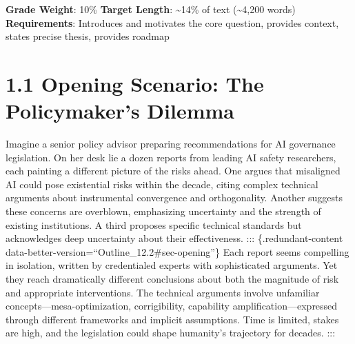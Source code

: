 \documentclass[
  11pt,
  letterpaper,
]{book}
\begin{document}
\begin{tcolorbox}[enhanced jigsaw, toprule=.15mm, colbacktitle=quarto-callout-note-color!10!white, opacitybacktitle=0.6, leftrule=.75mm, coltitle=black, rightrule=.15mm, opacityback=0, bottomtitle=1mm, title=\textcolor{quarto-callout-note-color}{\faInfo}\hspace{0.5em}{Chapter Overview}, toptitle=1mm, breakable, titlerule=0mm, left=2mm, arc=.35mm, colframe=quarto-callout-note-color-frame, bottomrule=.15mm, colback=white]

\textbf{Grade Weight}: 10\% \textbar{} \textbf{Target Length}:
\textasciitilde14\% of text (\textasciitilde4,200 words)\\
\textbf{Requirements}: Introduces and motivates the core question,
provides context, states precise thesis, provides roadmap

\end{tcolorbox}

\section*{1.1 Opening Scenario: The Policymaker's
Dilemma}\label{sec-opening-scenario}


\textcite{todd2024}

Imagine a senior policy advisor preparing recommendations for AI
governance legislation. On her desk lie a dozen reports from leading AI
safety researchers, each painting a different picture of the risks
ahead. One argues that misaligned AI could pose existential risks within
the decade, citing complex technical arguments about instrumental
convergence and orthogonality. Another suggests these concerns are
overblown, emphasizing uncertainty and the strength of existing
institutions. A third proposes specific technical standards but
acknowledges deep uncertainty about their effectiveness. :::
\{.redundant-content
data-better-version=``Outline\_12.2\#sec-opening''\} Each report seems
compelling in isolation, written by credentialed experts with
sophisticated arguments. Yet they reach dramatically different
conclusions about both the magnitude of risk and appropriate
interventions. The technical arguments involve unfamiliar
concepts---mesa-optimization, corrigibility, capability
amplification---expressed through different frameworks and implicit
assumptions. Time is limited, stakes are high, and the legislation could
shape humanity's trajectory for decades. :::
\end{document}
